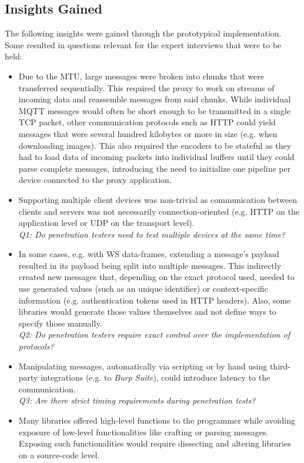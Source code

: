 \subsection{Insights Gained}
\label{sec:prototype-insights}
The following insights were gained through the prototypical implementation. Some resulted in questions relevant for the expert interviews that were to be held:
\begin{itemize}
    \item Due to the \ac{MTU}, large messages were broken into chunks that were transferred sequentially. This required the proxy to work on streams of incoming data and reassemble messages from said chunks. While individual \ac{MQTT} messages would often be short enough to be transmitted in a single \ac{TCP} packet, other communication protocols such as \ac{HTTP} could yield messages that were several hundred kilobytes or more in size (e.g. when downloading images). This also required the encoders to be stateful as they had to load data of incoming packets into individual buffers until they could parse complete messages, introducing the need to initialize one pipeline per device connected to the proxy application.
    \item Supporting multiple client devices was non-trivial as communication between clients and servers was not necessarily connection-oriented (e.g. \ac{HTTP} on the application level or \ac{UDP} on the transport level). \\
          \emph{Q1: Do penetration testers need to test multiple devices at the same time?}
    \item In some cases, e.g. with \ac{WS} data-frames, extending a message's payload resulted in its payload being split into multiple messages. This indirectly created new messages that, depending on the exact protocol used, needed to use generated values (such as an unique identifier) or context-specific information (e.g. authentication tokens used in \ac{HTTP} headers). Also, some libraries would generate those values themselves and not define ways to specify those manually.\\
          \emph{Q2: Do penetration testers require exact control over the implementation of protocols?}
    \item Manipulating messages, automatically via scripting or by hand using third-party integrations (e.g. to \emph{Burp Suite}), could introduce latency to the communication.\\
          \emph{Q3: Are there strict timing requirements during penetration tests?}
    \item Many libraries offered high-level functions to the programmer while avoiding exposure of low-level functionalities like crafting or parsing messages. Exposing such functionalities would require dissecting and altering libraries on a source-code level.
\end{itemize}


